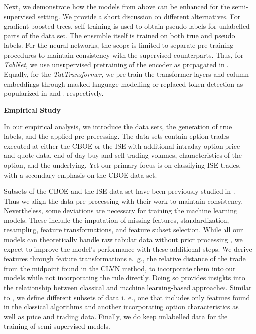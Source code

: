 Next, we demonstrate how the models from above can be enhanced for the semi-supervised setting. We provide a short discussion on different alternatives. For gradient-boosted trees, self-training \autocite{yarowskyUnsupervisedWordSense1995} is used to obtain pseudo labels for unlabelled parts of the data set. The ensemble itself is trained on both true and pseudo labels. For the neural networks, the scope is limited to separate pre-training procedures to maintain consistency with the supervised counterparts. Thus, for \textit{TabNet}, we use unsupervised pretraining of the encoder as propagated in \textcite{arikTabNetAttentiveInterpretable2020}. Equally, for the \textit{TabTransformer}, we pre-train the transformer layers and column embeddings through masked language modelling or replaced token detection as popularized in \textcite{devlinBERTPretrainingDeep2019} and \textcite{clarkELECTRAPretrainingText2020}, respectively. 

\textbf{Empirical Study}

In our empirical analysis, we introduce the data sets, the generation of true labels, and the applied pre-processing. The data sets contain option trades executed at either the \gls{CBOE} or the \gls{ISE} with additional intraday option price and quote data, end-of-day buy and sell trading volumes, characteristics of the option, and the underlying. Yet our primary focus is on classifying \gls{ISE} trades, with a secondary emphasis on the \gls{CBOE} data set. 

Subsets of the \gls{CBOE} and the \gls{ISE} data set have been previously studied in \textcite{grauerOptionTradeClassification2022}. Thus we align the data pre-processing with their work to maintain consistency. Nevertheless, some deviations are necessary for training the machine learning models. These include the imputation of missing features, standardization, resampling, feature transformations, and feature subset selection. While all our models can theoretically handle raw tabular data without prior processing \autocites{arikTabNetAttentiveInterpretable2020}{prokhorenkovaCatBoostUnbiasedBoosting2018}{huangTabTransformerTabularData2020}, we expect to improve the model's performance with these additional steps. We derive features through feature transformations e.~g., the relative distance of the trade from the midpoint found in the CLVN method, to incorporate them into our models while not incorporating the rule directly. Doing so provides insights into the relationship between classical and machine learning-based approaches. Similar to \textcite{ronenMachineLearningTrade2022}, we define different subsets of data i.~e., one that includes only features found in the classical algorithms and another incorporating option characteristics as well as price and trading data. Finally, we do keep unlabelled data for the training of semi-supervised models.

